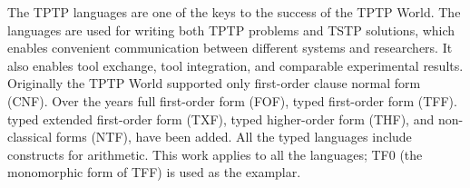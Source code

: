 \documentclass[letterpaper]{article}
\begin{document}
The TPTP languages \cite{Sut22-IGPL} are one of the keys to the success of the TPTP World.
The languages are used for writing both TPTP problems and TSTP solutions, which enables convenient 
communication between different systems and researchers. 
It also enables tool exchange, tool integration, and comparable experimental results.
Originally the TPTP World supported only first-order clause normal form (CNF).
Over the years full first-order form (FOF),
typed first-order form (TFF).
typed extended first-order form (TXF),
typed higher-order form (THF),
and non-classical forms (NTF),
have been added.
All the typed languages include constructs for arithmetic.
This work applies to all the languages; TF0 (the monomorphic form of TFF) \cite{SS+12} 
is used as the examplar.
\end{document}
